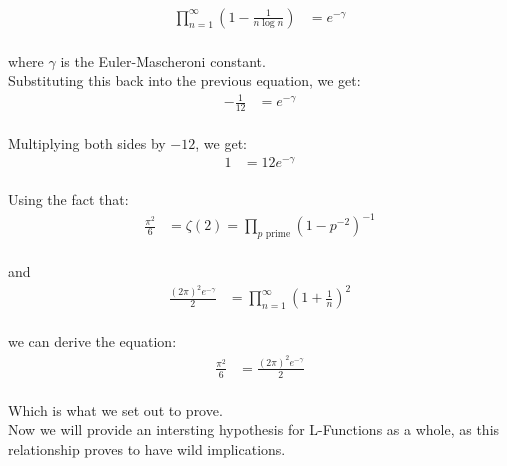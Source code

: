 \documentclass{article}
\begin{document}
 \\

\begin{align*}
\prod_{n=1}^{\infty} \left(1 - \frac{1}{n \log n}\right) &= e^{-\gamma} \\
\end{align*}

where $\gamma$ is the Euler-Mascheroni constant. \\

Substituting this back into the previous equation, we get: \\

\begin{align*}
-\frac{1}{12} &= e^{-\gamma} \\
\end{align*}

Multiplying both sides by $-12$, we get: \\

\begin{align*}
1 &= 12e^{-\gamma} \\
\end{align*}

Using the fact that: \\

\begin{align*}
\frac{\pi^2}{6} &= \zeta(2) = \prod_{p \text{ prime}} (1 - p^{-2})^{-1} \\
\end{align*}

and \\

\begin{align*}
\frac{(2\pi)^2 e^{-\gamma}}{2} &= \prod_{n=1}^{\infty} \left(1 + \frac{1}{n}\right)^2 \\
\end{align*}

we can derive the equation: \\

\begin{align*}
\frac{\pi^2}{6} &= \frac{(2\pi)^2 e^{-\gamma}}{2} \\
\end{align*}

Which is what we set out to prove. \\

Now we will provide an intersting hypothesis for L-Functions as a whole, as this relationship proves to have wild implications. \\
\end{document}
